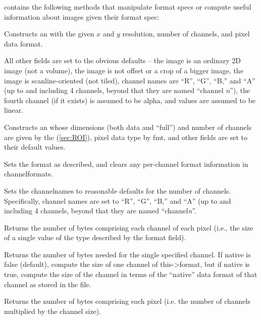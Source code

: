\noindent \ImageSpec contains the following methods that
manipulate format specs or compute useful information about images given
their format spec:

Constructs an \ImageSpec with the given $x$ and $y$ resolution, number
of channels, and pixel data format.

All other fields are set to the obvious defaults -- the image is an
ordinary 2D image (not a volume), the image is not offset or a crop of a
bigger image, the image is scanline-oriented (not tiled), channel names
are ``R'', ``G'', ``B,'' and ``A'' (up to and including 4 channels,
beyond that they are named ``channel \emph{n}''), the fourth channel (if
it exists) is assumed to be alpha, and values are assumed to be linear.
\apiend

\NEW %
Constructs an \ImageSpec whose dimensions (both data and ``full'') and
number of channels are given by the \ROI (\ref{sec:ROI}), pixel data type
by {\cf fmt}, and other fields are set to their default values.
\apiend

Sets the format as described, and clears any per-channel format information
in {\cf channelformats}.
\apiend

Sets the {\cf channelnames} to reasonable defaults for the number of
channels.  Specifically, channel names are set to ``R'', ``G'', ``B,''
and ``A'' (up to and including 4 channels, beyond that they are named
``channel\emph{n}''.
\apiend

Returns the number of bytes comprising each channel of each pixel (i.e.,
the size of a single value of the type described by the {\cf format} field).
\apiend

Returns the number of bytes needed for the single specified
channel.  If native is {\cf false} (default), compute the size of one
channel of {\cf this->format}, but if native is {\cf true}, compute the size
of the channel in terms of the ``native'' data format of that
channel as stored in the file.
\apiend

Returns the number of bytes comprising each pixel (i.e. the number of
channels multiplied by the channel size).

